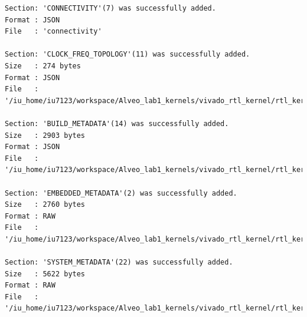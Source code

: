 \begin{lstlisting}
Section: 'CONNECTIVITY'(7) was successfully added.
Format : JSON
File   : 'connectivity'

Section: 'CLOCK_FREQ_TOPOLOGY'(11) was successfully added.
Size   : 274 bytes
Format : JSON
File   : '/iu_home/iu7123/workspace/Alveo_lab1_kernels/vivado_rtl_kernel/rtl_kernel_wizard_2_ex/exports/_x/link/int/vinc_xml.rtd'

Section: 'BUILD_METADATA'(14) was successfully added.
Size   : 2903 bytes
Format : JSON
File   : '/iu_home/iu7123/workspace/Alveo_lab1_kernels/vivado_rtl_kernel/rtl_kernel_wizard_2_ex/exports/_x/link/int/vinc_build.rtd'

Section: 'EMBEDDED_METADATA'(2) was successfully added.
Size   : 2760 bytes
Format : RAW
File   : '/iu_home/iu7123/workspace/Alveo_lab1_kernels/vivado_rtl_kernel/rtl_kernel_wizard_2_ex/exports/_x/link/int/vinc.xml'

Section: 'SYSTEM_METADATA'(22) was successfully added.
Size   : 5622 bytes
Format : RAW
File   : '/iu_home/iu7123/workspace/Alveo_lab1_kernels/vivado_rtl_kernel/rtl_kernel_wizard_2_ex/exports/_x/link/int/systemDiagramModelSlrBaseAddress.json'


\end{lstlisting}
